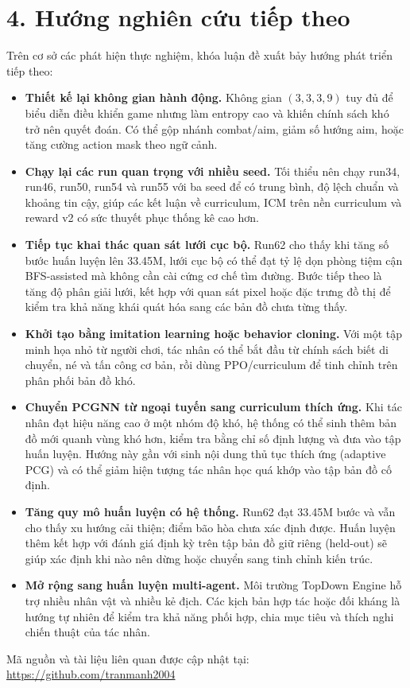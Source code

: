 \section*{4. Hướng nghiên cứu tiếp theo}

Trên cơ sở các phát hiện thực nghiệm, khóa luận đề xuất bảy hướng phát triển tiếp theo:

\begin{itemize}
    \item \textbf{Thiết kế lại không gian hành động.} Không gian $(3,3,3,9)$ tuy đủ để biểu diễn điều khiển game nhưng làm entropy cao và khiến chính sách khó trở nên quyết đoán. Có thể gộp nhánh combat/aim, giảm số hướng aim, hoặc tăng cường action mask theo ngữ cảnh.

    \item \textbf{Chạy lại các run quan trọng với nhiều seed.} Tối thiểu nên chạy run34, run46, run50, run54 và run55 với ba seed để có trung bình, độ lệch chuẩn và khoảng tin cậy, giúp các kết luận về curriculum, ICM trên nền curriculum và reward v2 có sức thuyết phục thống kê cao hơn.

    \item \textbf{Tiếp tục khai thác quan sát lưới cục bộ.} Run62 cho thấy khi tăng số bước huấn luyện lên 33.45M, lưới cục bộ có thể đạt tỷ lệ dọn phòng tiệm cận BFS-assisted mà không cần cài cứng cơ chế tìm đường. Bước tiếp theo là tăng độ phân giải lưới, kết hợp với quan sát pixel hoặc đặc trưng đồ thị để kiểm tra khả năng khái quát hóa sang các bản đồ chưa từng thấy.

    \item \textbf{Khởi tạo bằng imitation learning hoặc behavior cloning.} Với một tập minh họa nhỏ từ người chơi, tác nhân có thể bắt đầu từ chính sách biết di chuyển, né và tấn công cơ bản, rồi dùng PPO/curriculum để tinh chỉnh trên phân phối bản đồ khó.

    \item \textbf{Chuyển PCGNN từ ngoại tuyến sang curriculum thích ứng.} Khi tác nhân đạt hiệu năng cao ở một nhóm độ khó, hệ thống có thể sinh thêm bản đồ mới quanh vùng khó hơn, kiểm tra bằng chỉ số định lượng và đưa vào tập huấn luyện. Hướng này gần với sinh nội dung thủ tục thích ứng (adaptive PCG) và có thể giảm hiện tượng tác nhân học quá khớp vào tập bản đồ cố định.

    \item \textbf{Tăng quy mô huấn luyện có hệ thống.} Run62 đạt 33.45M bước và vẫn cho thấy xu hướng cải thiện; điểm bão hòa chưa xác định được. Huấn luyện thêm kết hợp với đánh giá định kỳ trên tập bản đồ giữ riêng (held-out) sẽ giúp xác định khi nào nên dừng hoặc chuyển sang tinh chỉnh kiến trúc.

    \item \textbf{Mở rộng sang huấn luyện multi-agent.} Môi trường TopDown Engine hỗ trợ nhiều nhân vật và nhiều kẻ địch. Các kịch bản hợp tác hoặc đối kháng là hướng tự nhiên để kiểm tra khả năng phối hợp, chia mục tiêu và thích nghi chiến thuật của tác nhân.
\end{itemize}

Mã nguồn và tài liệu liên quan được cập nhật tại:
\url{https://github.com/tranmanh2004}

